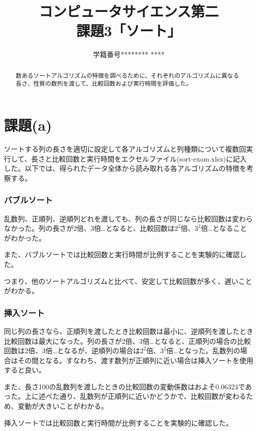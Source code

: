 \documentclass{jsarticle}
\title{コンピュータサイエンス第二\\課題3「ソート」}
\author{学籍番号******** ****}
\date{}
\begin{document}
\maketitle

\begin{abstract}

数あるソートアルゴリズムの特徴を調べるために、それぞれのアルゴリズムに異なる長さ、性質の数列を渡して、比較回数および実行時間を評価した。

\end{abstract}

\part{課題(a)}

ソートする列の長さを適切に設定して各アルゴリズムと列種類について複数回実行して、長さと比較回数と実行時間をエクセルファイル(sort-exam.xlsx)に記入した。以下では、得られたデータ全体から読み取れる各アルゴリズムの特徴を考察する。

\section{バブルソート}

乱数列、正順列、逆順列どれを渡しても、列の長さが同じなら比較回数は変わらなかった。列の長さが2倍、3倍…となると、比較回数は$2^2$倍、$3^2$倍…となることがわかった。

また、バブルソートでは比較回数と実行時間が比例することを実験的に確認した。

つまり、他のソートアルゴリズムと比べて、安定して比較回数が多く、遅いことがわかる。

\section{挿入ソート}

同じ列の長さなら、正順列を渡したとき比較回数は最小に、逆順列を渡したとき比較回数は最大になった。列の長さが2倍、3倍…となると、正順列の場合の比較回数は2倍、3倍…となるが、逆順列の場合は$2^2$倍、$3^2$倍…となった。乱数列の場合はその間となる。すなわち、渡す数列が正順列に近い場合は挿入ソートを使用すると良い。

また、長さ100の乱数列を渡したときの比較回数の変動係数はおよそ0.06324であった。上に述べた通り、乱数列が正順列に近いかどうかで、比較回数が変わるため、変動が大きいことがわかる。

挿入ソートでは比較回数と実行時間が比例することを実験的に確認した。
\end{document}
